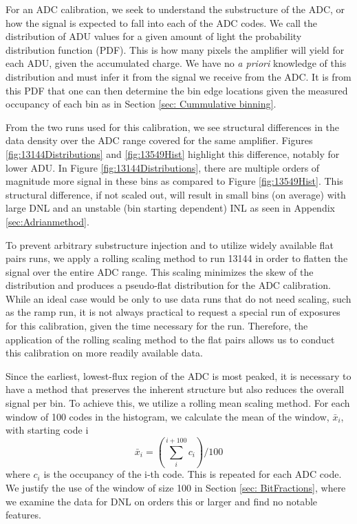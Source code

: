 \documentclass[linenumbers]{aastex7}
\begin{document}
For an ADC calibration, we seek to understand the substructure of the ADC, or how the signal is expected to fall into each of the ADC codes. 
We call the distribution of ADU values for a given amount of light the probability distribution function (PDF).
This is how many pixels the amplifier will yield for each ADU, given the accumulated charge. 
We have no \textit{a priori} knowledge of this distribution and must infer it from the signal we receive from the ADC.
It is from this PDF that one can then determine the bin edge locations given the measured occupancy of each bin as in Section \ref{sec: Cummulative binning}. 

From the two runs used for this calibration, we see structural differences in the data density over the ADC range covered for the same amplifier. 
Figures \ref{fig:13144Distributions} and \ref{fig:13549Hist} highlight this difference, notably for lower ADU.
In Figure \ref{fig:13144Distributions}, there are multiple orders of magnitude more signal in these bins as compared to Figure \ref{fig:13549Hist}. 
This structural difference, if not scaled out, will result in small bins (on average) with large DNL and an unstable (bin starting dependent) INL as seen in Appendix \ref{sec:Adrianmethod}. 

To prevent arbitrary substructure injection and to utilize widely available flat pairs runs, we apply a rolling scaling method to run 13144 in order to flatten the signal over the entire ADC range.
This scaling minimizes the skew of the distribution and produces a pseudo-flat distribution for the ADC calibration. 
While an ideal case would be only to use data runs that do not need scaling, such as the ramp run, it is not always practical to request a special run of exposures for this calibration, given the time necessary for the run. 
Therefore, the application of the rolling scaling method to the flat pairs allows us to conduct this calibration on more readily available data.

Since the earliest, lowest-flux region of the ADC is most peaked, it is necessary to have a method that preserves the inherent structure but also reduces the overall signal per bin.
To achieve this, we utilize a rolling mean scaling method. 
For each window of 100 codes in the histogram, we calculate the mean of the window, $\bar x_{i}$, with starting code i
\begin{equation}
\label{eq: rollingmean}
\bar x_{i} = (\sum_{i}^{i+100}c_{i})/100
\end{equation}
where $c_{i}$ is the occupancy of the i-th code. 
This is repeated for each ADC code. 
We justify the use of the window of size 100 in Section \ref{sec: BitFractions}, where we examine the data for DNL on orders this or larger and find no notable features. 
\end{document}
